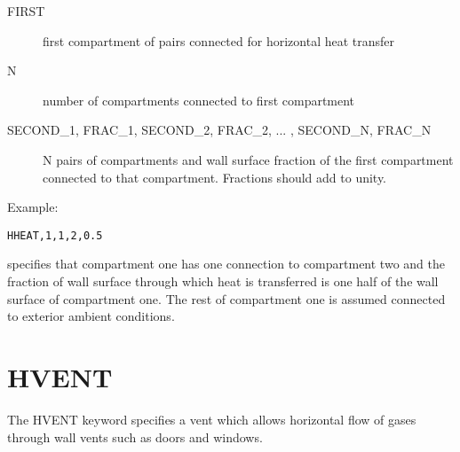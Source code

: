 \begin{adjustwidth}{1cm}{0cm}
\begin{description}
  \item[FIRST] first compartment of pairs connected for horizontal heat transfer
  \item[N] number of compartments connected to first compartment
  \item[SECOND\_1, FRAC\_1, SECOND\_2, FRAC\_2, ... ,  SECOND\_N, FRAC\_N] N pairs of compartments and wall surface fraction of the first compartment connected to that compartment. Fractions should add to unity.
\end{description}
\end{adjustwidth}

\noindent Example:

\begin{lstlisting}
HHEAT,1,1,2,0.5
\end{lstlisting}
specifies that compartment one has one connection to compartment two and the fraction of wall surface through which heat is transferred is one half of the wall surface of compartment one. The rest of compartment one is assumed connected to exterior ambient conditions.

\section{HVENT}

The HVENT keyword specifies a vent which allows horizontal flow of gases through wall vents such as doors and windows.

